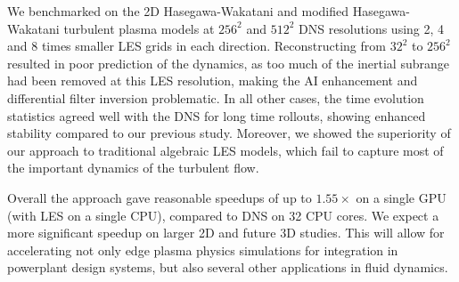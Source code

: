 \documentclass[authoryear,preprint,review,12pt]{elsarticle}
\begin{document}
We benchmarked on the 2D Hasegawa-Wakatani and modified Hasegawa-Wakatani turbulent plasma models at $256^2$ and $512^2$ DNS resolutions using 2, 4 and 8 times smaller LES grids in each direction. Reconstructing from $32^2$ to $256^2$ resulted in poor prediction of the dynamics, as too much of the inertial subrange had been removed at this LES resolution, making the AI enhancement and differential filter inversion problematic. In all other cases, the time evolution statistics agreed well with the DNS for long time rollouts, showing enhanced stability compared to our previous study. Moreover, we showed the superiority of our approach to traditional algebraic LES models, which fail to capture most of the important dynamics of the turbulent flow. 

Overall the approach gave reasonable speedups of up to $1.55 \times$ on a single GPU (with LES on a single CPU), compared to DNS on 32 CPU cores. We expect a more significant speedup on larger 2D and future 3D studies. This will allow for accelerating not only edge plasma physics simulations for integration in powerplant design systems, but also several other applications in fluid dynamics.


%
%
%
%
%
%
%
\end{document}
